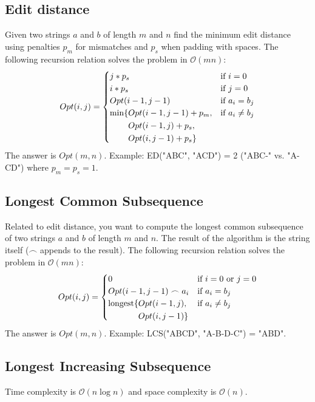 \documentclass[8pt,a4paper,landscape,oneside]{amsart}
\newcommand{\code}[1]{\inputminted[fontsize=\normalsize,baselinestretch=1]{java}{code/#1}}
\newcommand{\bigO}{\mathcal{O}}
\begin{document}
\begin{multicols*}{3}
  \subsection{Edit distance}
  Given two strings $a$ and $b$ of length $m$ and $n$ find the minimum edit distance using penalties $p_m$ for mismatches and $p_s$ when padding with spaces. The following recursion relation solves the problem in $\bigO(mn)$:
  \[
  Opt(i,j) = \begin{cases}
  j*p_s & \text{if } i=0 \\
  i*p_s & \text{if } j=0 \\
  Opt(i-1,j-1) & \text{if } a_i=b_j \\
  \begin{aligned}[t]\arraycolsep=0pt
    \min\lbrace &
      Opt(i-1,j-1) + p_m, \\ &
      Opt(i-1,j) + p_s, \\ & 
      Opt(i,j-1) + p_s \rbrace
  \end{aligned} & \text{if } a_i\neq b_j
  \end{cases}
  \]
  The answer is $Opt(m,n)$. Example: ED("ABC", "ACD") = 2 ("ABC-" vs. "A-CD") where $p_m = p_s = 1$.
  
  \subsection{Longest Common Subsequence}
  Related to edit distance, you want to compute the longest common subsequence of two strings $a$ and $b$ of length $m$ and $n$. The result of the algorithm is the string itself ($\frown$ appends to the result). The following recursion relation solves the problem in $\bigO(mn)$:
  \[
  Opt(i,j) = \begin{cases}
  0 & \text{if } i=0 \text{ or } j=0 \\
  Opt(i-1,j-1) \frown a_i & \text{if } a_i=b_j \\
  \begin{aligned}[t]\arraycolsep=0pt
    \mathrm{longest}\lbrace &
      Opt(i-1,j), \\ & 
      Opt(i,j-1) \rbrace
  \end{aligned} & \text{if } a_i\neq b_j
  \end{cases}
  \]
  The answer is $Opt(m,n)$. Example: LCS("ABCD", "A-B-D-C") = "ABD".
  
  \subsection{Longest Increasing Subsequence}
  Time complexity is $\bigO(n\log n)$ and space complexity is $\bigO(n)$.
  \code{DP/LongestIncreasingSubsequence.java}
  

\end{multicols*}
\end{document}
